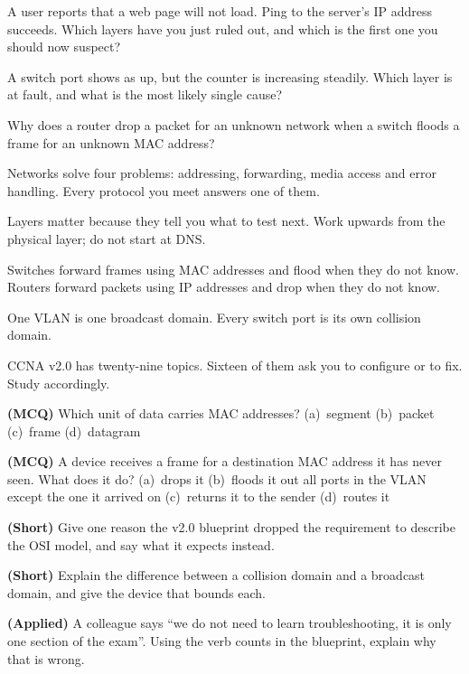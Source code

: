 \begin{checkpoint}
\begin{tightnum}
  \item A user reports that a web page will not load. Ping to the server's IP
        address succeeds. Which layers have you just ruled out, and which is the
        first one you should now suspect?
  \item A switch port shows as up, but the  counter is
        increasing steadily. Which layer is at fault, and what is the most likely
        single cause?
  \item Why does a router drop a packet for an unknown network when a switch
        floods a frame for an unknown MAC address?
\end{tightnum}
\end{checkpoint}

\begin{chaptersummary}
\begin{tight}
  \item Networks solve four problems: addressing, forwarding, media access and
        error handling. Every protocol you meet answers one of them.
  \item Layers matter because they tell you what to test next. Work upwards from
        the physical layer; do not start at DNS.
  \item Switches forward frames using MAC addresses and flood when they do not
        know. Routers forward packets using IP addresses and drop when they do
        not know.
  \item One VLAN is one broadcast domain. Every switch port is its own collision
        domain.
  \item CCNA v2.0 has twenty-nine topics. Sixteen of them ask you to configure
        or to fix. Study accordingly.
\end{tight}
\end{chaptersummary}

\begin{reviewq}
  \item \textbf{(MCQ)} Which unit of data carries MAC addresses?
        (a)~segment (b)~packet (c)~frame (d)~datagram
  \item \textbf{(MCQ)} A device receives a frame for a destination MAC address
        it has never seen. What does it do?
        (a)~drops it (b)~floods it out all ports in the VLAN except the one it
        arrived on (c)~returns it to the sender (d)~routes it
  \item \textbf{(Short)} Give one reason the v2.0 blueprint dropped the
        requirement to describe the OSI model, and say what it expects instead.
  \item \textbf{(Short)} Explain the difference between a collision domain and a
        broadcast domain, and give the device that bounds each.
  \item \textbf{(Applied)} A colleague says ``we do not need to learn
        troubleshooting, it is only one section of the exam''. Using the verb
        counts in the blueprint, explain why that is wrong.
\end{reviewq}
